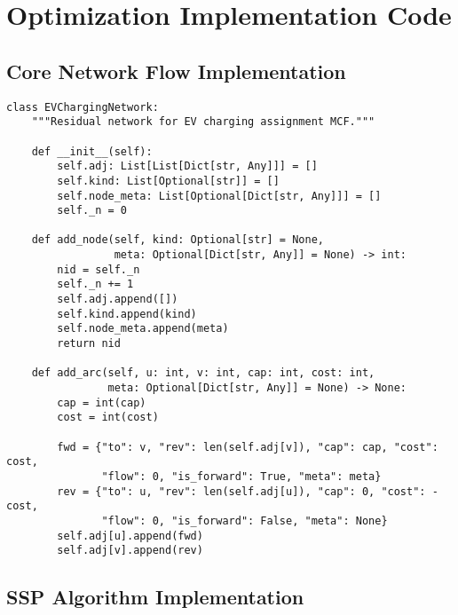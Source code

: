 \documentclass[12pt,a4paper]{article}
\begin{document}
\section{Optimization Implementation Code}

\subsection{Core Network Flow Implementation}

\begin{lstlisting}[caption=EVChargingNetwork Class]
class EVChargingNetwork:
    """Residual network for EV charging assignment MCF."""
    
    def __init__(self):
        self.adj: List[List[Dict[str, Any]]] = []
        self.kind: List[Optional[str]] = []
        self.node_meta: List[Optional[Dict[str, Any]]] = []
        self._n = 0

    def add_node(self, kind: Optional[str] = None, 
                 meta: Optional[Dict[str, Any]] = None) -> int:
        nid = self._n
        self._n += 1
        self.adj.append([])
        self.kind.append(kind)
        self.node_meta.append(meta)
        return nid

    def add_arc(self, u: int, v: int, cap: int, cost: int, 
                meta: Optional[Dict[str, Any]] = None) -> None:
        cap = int(cap)
        cost = int(cost)
        
        fwd = {"to": v, "rev": len(self.adj[v]), "cap": cap, "cost": cost,
               "flow": 0, "is_forward": True, "meta": meta}
        rev = {"to": u, "rev": len(self.adj[u]), "cap": 0, "cost": -cost,
               "flow": 0, "is_forward": False, "meta": None}
        self.adj[u].append(fwd)
        self.adj[v].append(rev)
\end{lstlisting}

\subsection{SSP Algorithm Implementation}
\end{document}
